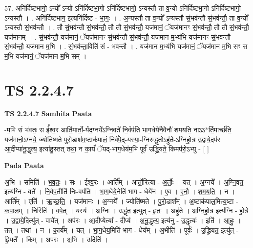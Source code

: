 \documentclass[17pt]{extarticle}
\begin{document}
57. अनि॑र्दिष्टभागो॒ ऽन्यो᳚ ऽन्यो ऽनि॑र्दिष्टभा॒गो ऽनि॑र्दिष्टभागो॒ ऽन्यस्तौ ता व॒न्यो ऽनि॑र्दिष्टभा॒गो ऽनि॑र्दिष्टभागो॒ ऽन्यस्तौ । . अनि॑र्दिष्टभाग॒ इत्यनि॑र्दिष्ट - भा॒गः॒ । . अ॒न्यस्तौ ता व॒न्यो᳚ ऽन्यस्तौ सं॒भव॑न्तौ सं॒भव॑न्तौ॒ ता व॒न्यो᳚ ऽन्यस्तौ सं॒भव॑न्तौ । . तौ सं॒भव॑न्तौ सं॒भव॑न्तौ॒ तौ तौ सं॒भव॑न्तौ॒ यज॑मानं॒ ॅयज॑मानꣳ सं॒भव॑न्तौ॒ तौ तौ सं॒भव॑न्तौ॒ यज॑मानम् । . सं॒भव॑न्तौ॒ यज॑मानं॒ ॅयज॑मानꣳ सं॒भव॑न्तौ सं॒भव॑न्तौ॒ यज॑मान म॒भ्य॑भि यज॑मानꣳ सं॒भव॑न्तौ सं॒भव॑न्तौ॒ यज॑मान म॒भि । . सं॒भव॑न्ता॒विति॑ सं - भव॑न्तौ । . यज॑मान म॒भ्य॑भि यज॑मानं॒ ॅयज॑मान म॒भि सꣳ स म॒भि यज॑मानं॒ ॅयज॑मान म॒भि सम् । \newline
\pagebreak
{}
\section*{ TS 2.2.4.7 }

\textbf{TS 2.2.4.7 } \newline
\textbf{Samhita Paata} \newline

-म॒भि सं भ॑वतः॒ स ई᳚श्व॒र आर्ति॒मार्तो॒-र्यद॒ग्नये᳚ऽग्नि॒वते॑ नि॒र्वप॑ति भाग॒धेये॑नै॒वैनौ॑ शमयति॒ नाऽऽ*र्ति॒मार्च्छ॑ति॒ यज॑मानो॒ऽग्नये॒ ज्योति॑ष्मते पुरो॒डाश॑म॒ष्टाक॑पालं॒ निर्व॑पे॒द्-यस्या॒-ग्निरुद्धृ॒तोऽहु॑ते-ऽग्निहो॒त्र उ॒द्वाये॒दप॑र आ॒दीप्या॑नू॒द्धृत्य॒ इत्या॑हु॒स्तत् तथा॒ न का॒र्यं॑ ॅयद्-भा॑ग॒धेय॑म॒भि पूर्व॑ उद्ध्रि॒यते॒ किमप॑रो॒ऽभ्यु - [  ] \newline

\textbf{Pada Paata} \newline

अ॒भि । समिति॑ । भ॒व॒तः॒ । सः । ई॒श्व॒रः । आर्ति᳚म् । आर्तो॒रित्या - अ॒र्तोः॒ । यत् । अ॒ग्नये᳚ । अ॒ग्नि॒वत॒ इत्य॑ग्नि - वते᳚ । नि॒र्वप॒तीति॑ निः-वप॑ति । भा॒ग॒धेये॒नेति॑ भाग - धेये॑न । ए॒व । ए॒नौ॒ । श॒म॒य॒ति॒ । न । आर्ति᳚म् । एति॑ । ऋ॒च्छ॒ति॒ । यज॑मानः । अ॒ग्नये᳚ । ज्योति॑ष्मते । पु॒रो॒डाश᳚म् । अ॒ष्टाक॑पाल॒मित्य॒ष्टा - क॒पा॒ल॒म् । निरिति॑ । व॒पे॒त् । यस्य॑ । अ॒ग्निः । उद्धृ॑त॒ इत्युत् - हृ॒तः॒ । अहु॑ते । अ॒ग्नि॒हो॒त्र इत्य॑ग्नि - हो॒त्रे । उ॒द्वाये॒दित्यु॑त् - वाये᳚त् । अप॑रः । आ॒दीप्येत्या᳚ - दीप्य॑ । अ॒नू॒द्धृत्य॒ इत्य॑नु - उ॒द्धृत्यः॑ । इति॑ । आ॒हुः॒ । तत् । तथा᳚ । न । का॒र्य᳚म् । यत् । भा॒ग॒धेय॒मिति॑ भाग - धेय᳚म् । अ॒भीति॑ । पूर्वः॑ । उ॒द्ध्रि॒यत॒ इत्यु॑त् - ह्रि॒यते᳚ । किम् । अप॑रः । अ॒भि । उदिति॑ ।  \newline
\end{document}
